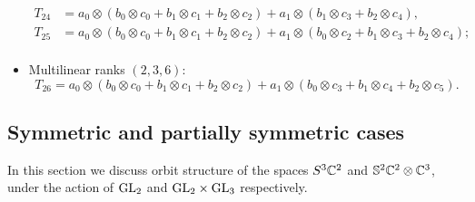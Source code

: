 \begin{itemize}
\begin{align*}
T_{24} &= a_0 \otimes (b_0 \otimes c_0 + b_1 \otimes c_1 + b_2 \otimes c_2) + a_1 \otimes (b_1 \otimes c_3 + b_2 \otimes c_4), \\
T_{25} &= a_0 \otimes (b_0 \otimes c_0 +  b_1 \otimes c_1 + b_2 \otimes c_2) + a_1 \otimes (b_0 \otimes c_2 + b_1 \otimes c_3 + b_2 \otimes c_4);\\
\end{align*}
\item Multilinear ranks $(2,3,6)$:
\[
T_{26} = a_0 \otimes (b_0 \otimes c_0 +  b_1 \otimes c_1 + b_2 \otimes c_2) + a_1 \otimes (b_0 \otimes c_3 + b_1 \otimes c_4 + b_2 \otimes c_5).
\]
\end{itemize}

% 

\subsection*{Symmetric and partially symmetric cases}

In this section we discuss orbit structure of the spaces $S^3 \mathbb{C}^2$ and $\mathbb{S}^2 \mathbb{C}^2 \otimes \mathbb{C}^3$, under the action of $\mathrm{GL}_2$ and $\mathrm{GL}_2 \times \mathrm{GL}_3$ respectively.


